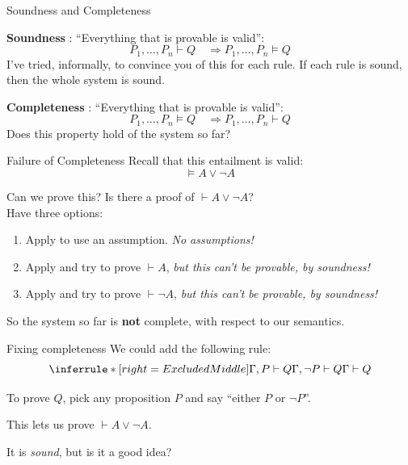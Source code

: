 \documentclass[xetex,aspectratio=169,14pt,hyperref={pdfpagelabels=true,pdflang={en-GB}}]{beamer}
\begin{document}

\begin{frame}
  {Soundness and Completeness}

  \textbf{Soundness} : ``Everything that is provable is valid'':
  \begin{displaymath}
    P_1, \dots, P_n \vdash Q \quad \Rightarrow P_1, \dots, P_n \models Q
  \end{displaymath}
  I've tried, informally, to convince you of this for each rule. If
  each rule is sound, then the whole system is sound.

  \bigskip
  \pause

  \textbf{Completeness} : ``Everything that is provable is valid'':
  \begin{displaymath}
    P_1, \dots, P_n \models Q \quad \Rightarrow P_1, \dots, P_n \vdash Q
  \end{displaymath}
  Does this property hold of the system so far?
\end{frame}

\begin{frame}
  {Failure of Completeness}
  Recall that this entailment is valid:
  \begin{displaymath}
    \models A \lor \lnot A
  \end{displaymath}

  \bigskip

  Can we prove this? \pause Is there a proof of
  $\vdash A \lor \lnot A$? \\ \pause
  Have three options:
  \begin{enumerate}
  \item Apply  to use an assumption. \pause\emph{No assumptions!}\pause
  \item Apply  and try to prove $\vdash A$, \pause\emph{but
      this can't be provable, by soundness!}\pause
  \item Apply  and try to prove $\vdash \lnot A$,
    \pause\emph{but this can't be provable, by soundness!}\pause
  \end{enumerate}
  So the system so far is {\bf not} complete, with respect to our
  semantics.
\end{frame}

\begin{frame}
  {Fixing completeness}
  We could add the following rule:
  \begin{displaymath}
    \inferrule* [right=ExcludedMiddle]
    {\Gamma, P \vdash Q \\ \Gamma, \lnot P \vdash Q}
    {\Gamma \vdash Q}
  \end{displaymath}

  \pause
  \bigskip

  To prove $Q$, pick any proposition $P$ and say ``either $P$
  or $\lnot P$''.

  \bigskip
  \pause

  This lets us prove $\vdash A \lor \lnot A$.

  \bigskip
  \pause

  It is \emph{sound}, but is it a good idea?
\end{frame}
\end{document}
